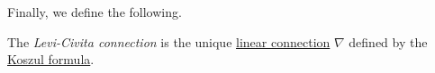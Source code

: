 Finally, we define the following.

\begin{definition}\label{def:Levi-Civita-connection}
	The \emph{Levi-Civita connection} is the unique \hyperref[def:linear-connection]{linear connection} \(\nabla \) defined by the \hyperref[eq:Koszul-formula]{Koszul formula}.
\end{definition}